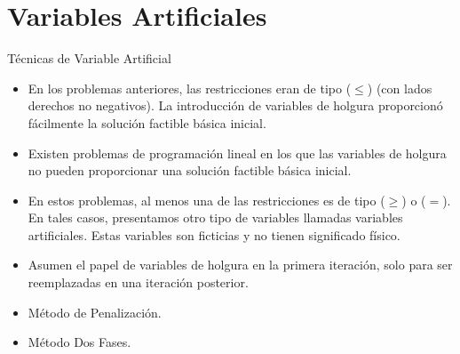 \section{Variables Artificiales}
\label{sec:artificial-variables}


\begin{frame}{Técnicas de Variable Artificial}
  \begin{itemize} \parskip3mm \justifying
  \item<only@1> En los problemas anteriores, las restricciones eran de tipo ($\leq$) (con lados derechos no negativos). La introducción de variables de holgura proporcionó fácilmente la solución factible básica inicial. 
  \item<only@1> Existen  problemas de programación lineal en los que las \alert{variables de holgura no pueden proporcionar una solución factible básica inicial.} 
  \item<only@1> En estos problemas, \alert{al menos una de las restricciones es de tipo ($\geq$) o ($=$)}. En tales casos, presentamos otro tipo de variables llamadas \alert{variables artificiales}. Estas variables son ficticias y no tienen significado físico. 
  \item<only@1> Asumen el papel de \alert{variables de holgura en la primera iteración}, solo para ser \alert{reemplazadas en una iteración posterior. }
  \item<only@2> Método de Penalización.
  \item<only@2> Método Dos Fases.   
  \end{itemize}
\end{frame}



